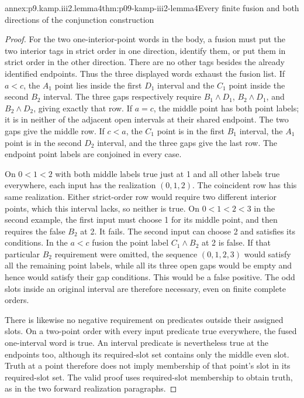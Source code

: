 \begin{annexitem}{annex:p9.kamp.iii2.lemma4}{thm:p09-kamp-iii2-lemma4}{Every finite fusion and both directions of the conjunction construction}
\begin{proof}
For the two one-interior-point words in the body, a fusion must put the
two interior tags in strict order in one direction, identify them,
or put them in strict order in the other direction. There are no other
tags besides the already identified endpoints. Thus the three displayed
words exhaust the fusion list. If \(a<c\), the \(A_1\) point lies
inside the first \(D_1\) interval and the \(C_1\) point inside the
second \(B_2\) interval. The three gaps respectively require
\(B_1\land D_1\), \(B_2\land D_1\), and
\(B_2\land D_2\), giving exactly that row. If \(a=c\), the
middle point has both point labels; it is in neither of the adjacent
open intervals at their shared endpoint. The two gaps give the middle
row. If \(c<a\), the \(C_1\) point is in the first \(B_1\)
interval, the \(A_1\) point is in the second \(D_2\) interval,
and the three gaps give the last row. The endpoint point labels are
conjoined in every case.

On \(0<1<2\) with both middle labels true just at 1 and all other
labels true everywhere, each input has the realization \((0,1,2)\).
The coincident row has this same realization. Either strict-order row
would require two different interior points, which this interval lacks,
so neither is true. On \(0<1<2<3\) in the second example, the first
input must choose 1 for its middle point, and then requires the false
\(B_2\) at 2. It fails. The second input can choose 2 and satisfies
its conditions. In the \(a<c\) fusion the point label
\(C_1\land B_2\) at 2 is false. If that particular \(B_2\)
requirement were omitted, the sequence \((0,1,2,3)\) would satisfy
all the remaining point labels, while all its three open gaps would
be empty and hence would satisfy their gap conditions. This would be
a false positive. The odd slots inside an original interval are
therefore necessary, even on finite complete orders.

There is likewise no negative requirement on predicates outside their
assigned slots. On a two-point order with every input predicate true
everywhere, the fused one-interval word is true. An interval predicate
is nevertheless true at the endpoints too, although its required-slot
set contains only the middle even slot. Truth at a point therefore
does not imply membership of that point's slot in its required-slot
set. The valid proof uses required-slot membership to obtain truth,
as in the two forward realization paragraphs.


\end{proof}
\end{annexitem}
